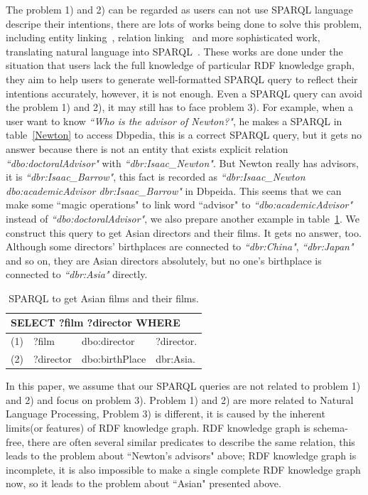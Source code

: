 \documentclass[runningheads]{llncs}
\begin{document}
The problem 1) and 2) can be regarded as users can not use SPARQL language descripe their intentions, there are lots of works being done to solve this problem, including entity linking~\cite{el_Han}, relation linking~\cite{dubey2018earl} and more sophisticated work, translating natural language into SPARQL~\cite{sander2014ontology}.
These works are done under the situation that users lack the full knowledge of particular RDF knowledge graph, they aim to help users to generate well-formatted SPARQL query to reflect their intentions accurately, however, it is not enough. Even a SPARQL query can avoid the problem 1) and 2), it may still has to face problem 3).
For example, when a user want to know \textit{``Who is the advisor of Newton?"}, he makes a SPARQL in table~\ref{Newton} to access Dbpedia, this is a correct SPARQL query, but it gets no answer because there is not an entity that exists explicit relation \textit{``dbo:doctoralAdvisor"} with \textit{``dbr:Isaac\_Newton"}. But Newton really has advisors, it is \textit{``dbr:Isaac\_Barrow"}, this fact is recorded as \textit{``dbr:Isaac\_Newton dbo:academicAdvisor dbr:Isaac\_Barrow" } in Dbpeida.  This seems that we can make some ``magic operations" to link word ``advisor" to \textit{``dbo:academicAdvisor"} instead of \textit{``dbo:doctoralAdvisor"}, we also prepare another example in table~\ref{film_table}. We construct this query to get Asian directors and their films. It gets no answer, too. Although some directors' birthplaces are connected to \textit{``dbr:China"}, \textit{``dbr:Japan"} and so on, they are Asian directors absolutely, but no one's birthplace is connected to \textit{``dbr:Asia"} directly.

\begin{table}
\caption{SPARQL to get Asian films and their films.}\label{film_table}
\centering
\begin{tabular}{|c|lll|}
\hline
\multicolumn{4}{|l|}{SELECT ?film ?director WHERE }\\
\hline
(1) &  ?film & dbo:director & ?director.\\
(2) &  ?director & dbo:birthPlace & dbr:Asia.\\
\hline
\end{tabular}
\end{table}

In this paper, we assume that our SPARQL queries are not related to problem 1) and 2) and focus on problem 3).
Problem 1) and 2) are more related to Natural Language Processing, Problem 3) is different, it is caused by the inherent limits(or features) of RDF knowledge graph. RDF knowledge graph is schema-free, there are often several similar predicates to describe the same relation, this leads to the problem about ``Newton's advisors" above; RDF knowledge graph is incomplete, it is also impossible to make a single complete RDF knowledge graph now, so it leads to the problem about ``Asian" presented above.
\end{document}
